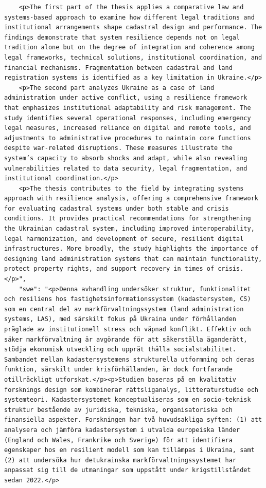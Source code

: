 \begin{casestudySection}
\begin{lstlisting}
    <p>The first part of the thesis applies a comparative law and systems-based approach to examine how different legal traditions and institutional arrangements shape cadastral design and performance. The findings demonstrate that system resilience depends not on legal tradition alone but on the degree of integration and coherence among legal frameworks, technical solutions, institutional coordination, and financial mechanisms. Fragmentation between cadastral and land registration systems is identified as a key limitation in Ukraine.</p>
    <p>The second part analyzes Ukraine as a case of land administration under active conflict, using a resilience framework that emphasizes institutional adaptability and risk management. The study identifies several operational responses, including emergency legal measures, increased reliance on digital and remote tools, and adjustments to administrative procedures to maintain core functions despite war-related disruptions. These measures illustrate the system’s capacity to absorb shocks and adapt, while also revealing vulnerabilities related to data security, legal fragmentation, and institutional coordination.</p>
    <p>The thesis contributes to the field by integrating systems approach with resilience analysis, offering a comprehensive framework for evaluating cadastral systems under both stable and crisis conditions. It provides practical recommendations for strengthening the Ukrainian cadastral system, including improved interoperability, legal harmonization, and development of secure, resilient digital infrastructures. More broadly, the study highlights the importance of designing land administration systems that can maintain functionality, protect property rights, and support recovery in times of crisis.</p>",
    "swe": "<p>Denna avhandling undersöker struktur, funktionalitet och resiliens hos fastighetsinformationssystem (kadastersystem, CS) som en central del av markförvaltningssystem (land administration systems, LAS), med särskilt fokus på Ukraina under förhållanden präglade av institutionell stress och väpnad konflikt. Effektiv och säker markförvaltning är avgörande för att säkerställa äganderätt, stödja ekonomisk utveckling och upprät thålla socialstabilitet. Sambandet mellan kadastersystemens strukturella utformning och deras funktion, särskilt under krisförhållanden, är dock fortfarande otillräckligt utforskat.</p><p>Studien baseras på en kvalitativ forsknings design som kombinerar rättsliganalys, litteraturstudie och systemteori. Kadastersystemet konceptualiseras som en socio-teknisk struktur bestående av juridiska, tekniska, organisatoriska och finansiella aspekter. Forskningen har två huvudsakliga syften: (1) att analysera och jämföra kadastersystem i utvalda europeiska länder (England och Wales, Frankrike och Sverige) för att identifiera egenskaper hos en resilient modell som kan tillämpas i Ukraina, samt (2) att undersöka hur detukrainska markförvaltningssystemet har anpassat sig till de utmaningar som uppstått under krigstillståndet sedan 2022.</p>

\end{lstlisting}
\end{casestudySection}
